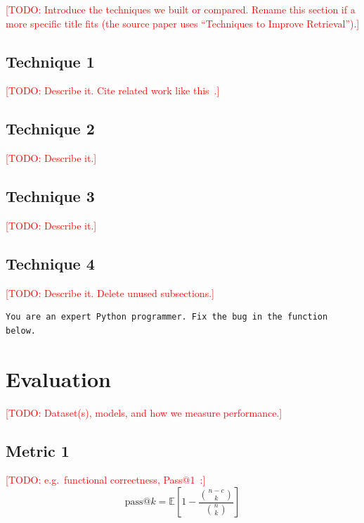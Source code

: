 \documentclass[11pt]{article}
\newcommand{\todo}[1]{\textcolor{red}{[TODO: #1]}}
\begin{document}
\todo{Introduce the techniques we built or compared. Rename this section if a
more specific title fits (the source paper uses ``Techniques to Improve
Retrieval'').}

\subsection{Technique 1}
\label{sec:tech1}
\todo{Describe it. Cite related work like this~\cite{chen2021codex}.}

\subsection{Technique 2}
\label{sec:tech2}
\todo{Describe it.}

\subsection{Technique 3}
\label{sec:tech3}
\todo{Describe it.}

\subsection{Technique 4}
\label{sec:tech4}
\todo{Describe it. Delete unused subsections.}

\begin{lstlisting}[caption={\todo{Example prompt.}},label={lst:prompt}]
You are an expert Python programmer. Fix the bug in the function below.
\end{lstlisting}

\section{Evaluation}
\label{sec:evaluation}

\todo{Dataset(s), models, and how we measure performance.}

\subsection{Metric 1}
\label{sec:eval-metric1}
\todo{e.g.\ functional correctness, Pass@1~\cite{chen2021codex}:}
\begin{equation}
  \text{pass@}k = \mathbb{E}\left[1 - \frac{\binom{n-c}{k}}{\binom{n}{k}}\right]
  \label{eq:passk}
\end{equation}
\end{document}
